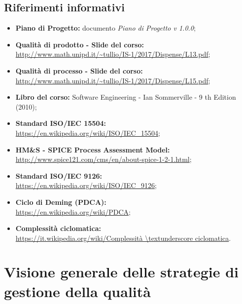 \documentclass[openany,12pt,a4paper]{report}
\begin{document}
    \section{Riferimenti informativi}
    
    \begin{itemize}
        \item \textbf{Piano di Progetto:} documento \textit{Piano di Progetto v 1.0.0};
        
        \item \textbf{Qualità di prodotto - Slide del corso:} 
        \\ \url{http://www.math.unipd.it/~tullio/IS-1/2017/Dispense/L13.pdf};
        
        \item \textbf{Qualità di processo - Slide del corso:} \\ \url{http://www.math.unipd.it/~tullio/IS-1/2017/Dispense/L15.pdf};
        
        \item \textbf{Libro del corso:} Software Engineering - Ian Sommerville - 9 th Edition (2010);
        
        \item \textbf{Standard ISO/IEC 15504:} 
        \\ \url{https://en.wikipedia.org/wiki/ISO/IEC_15504};
        
        \item \textbf{HM\&S - SPICE Process Assessment Model:} 
        \\ \url{http://www.spice121.com/cms/en/about-spice-1-2-1.html};
        
        \item \textbf{Standard ISO/IEC 9126:}
        \\ \url{https://en.wikipedia.org/wiki/ISO/IEC_9126};
        
        \item \textbf{Ciclo di Deming (PDCA):} 
        \\ \url{https://en.wikipedia.org/wiki/PDCA};
        
        \item \textbf{Complessità ciclomatica:} 
        \\ \url{https://it.wikipedia.org/wiki/Complessità \textunderscore ciclomatica}.
    \end{itemize}


\chapter{Visione generale delle strategie di gestione della qualità}
    
\end{document}
